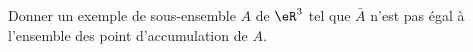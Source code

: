 \begin{exercice}\label{exoGeomAnal-0014}

	Donner un exemple de sous-ensemble $A$ de $\eR^3$ tel que $\bar A$ n'est pas égal à l'ensemble des point d'accumulation de $A$.

\end{exercice}
